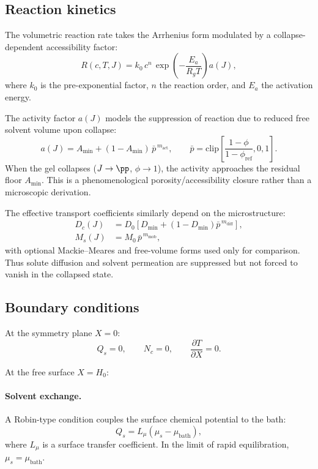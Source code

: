 \subsection{Reaction kinetics}

The volumetric reaction rate takes the Arrhenius form modulated by a collapse-dependent accessibility factor:
\begin{equation}
  R(c,T,J) = k_0\,c^n\,\exp\!\left(-\frac{E_a}{R_g T}\right) a(J),
  \label{eq:R}
\end{equation}
where $k_0$ is the pre-exponential factor, $n$ the reaction order, and $E_a$ the activation energy.

The activity factor $a(J)$ models the suppression of reaction due to reduced free solvent volume upon collapse:
\begin{equation}
  a(J) = A_\mathrm{min}+(1-A_\mathrm{min})\,
  \bar p^{\,m_\mathrm{act}}, \qquad
  \bar p=\mathrm{clip}\!\left[
    \frac{1-\phi}{1-\phi_\mathrm{ref}},0,1\right].
  \label{eq:aJ}
\end{equation}
When the gel collapses ($J\to\pp$, $\phi\to 1$), the activity approaches
the residual floor $A_\mathrm{min}$.  This is a phenomenological
porosity/accessibility closure rather than a microscopic derivation.

The effective transport coefficients similarly depend on the microstructure:
\begin{align}
  D_c(J) &= D_0\left[D_\mathrm{min}+(1-D_\mathrm{min})
  \bar p^{\,m_\mathrm{diff}}\right], \label{eq:Dc} \\
  M_s(J) &= M_0\,\bar p^{\,m_\mathrm{mob}}, \label{eq:Ms}
\end{align}
with optional Mackie--Meares and free-volume forms used only for
comparison.  Thus solute diffusion and solvent permeation are
suppressed but not forced to vanish in the collapsed state.

\subsection{Boundary conditions}

At the symmetry plane $X=0$:
\begin{equation}
  Q_s = 0, \qquad N_c = 0, \qquad \frac{\partial T}{\partial X} = 0.
  \label{eq:bc_sym}
\end{equation}

At the free surface $X=H_0$:

\paragraph{Solvent exchange.}
A Robin-type condition couples the surface chemical potential to the bath:
\begin{equation}
  Q_s = L_\mu\!\left(\mu_s - \mu_\mathrm{bath}\right),
  \label{eq:bc_mu}
\end{equation}
where $L_\mu$ is a surface transfer coefficient. In the limit of rapid equilibration, $\mu_s = \mu_\mathrm{bath}$.

